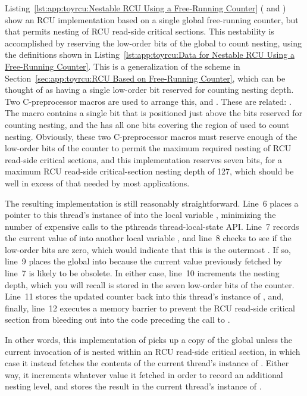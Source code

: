Listing~\ref{lst:app:toyrcu:Nestable RCU Using a Free-Running Counter}
( and )
show an RCU implementation based on a single global free-running counter,
but that permits nesting of RCU read-side critical sections.
This nestability is accomplished by reserving the low-order bits of the
global  to count nesting, using the definitions shown in
Listing~\ref{lst:app:toyrcu:Data for Nestable RCU Using a Free-Running Counter}.
This is a generalization of the scheme in
Section~\ref{sec:app:toyrcu:RCU Based on Free-Running Counter},
which can be thought of as having a single low-order bit reserved
for counting nesting depth.
Two C-preprocessor macros are used to arrange this,
 and
.
These are related: .
The  macro contains a single bit that is
positioned just above the bits reserved for counting nesting,
and the  has all one bits covering the
region of  used to count nesting.
Obviously, these two C-preprocessor macros must reserve enough
of the low-order bits of the counter to permit the maximum required
nesting of RCU read-side critical sections, and this implementation
reserves seven bits, for a maximum RCU read-side critical-section
nesting depth of 127, which should be well in excess of that needed
by most applications.

The resulting  implementation is still reasonably
straightforward.
Line~6 places a pointer to this thread's instance of 
into the local variable , minimizing the number of expensive
calls to the pthreads thread-local-state API.
Line~7 records the current value of  into another
local variable , and line~8 checks to see if the low-order
bits are zero, which would indicate that this is the outermost
.
If so, line~9 places the global  into  because
the current value previously fetched by line~7 is likely to be obsolete.
In either case, line~10 increments the nesting depth, which you will
recall is stored in the seven low-order bits of the counter.
Line~11 stores the updated counter back into this thread's instance
of , and, finally, line~12 executes a memory
barrier to prevent the RCU read-side critical section from bleeding out
into the code preceding the call to .

In other words, this implementation of  picks up a copy
of the global  unless the current invocation of
 is nested within an RCU read-side critical section,
in which case it instead fetches the contents of the current thread's
instance of .
Either way, it increments whatever value it fetched in order to record
an additional nesting level, and stores the result in the current
thread's instance of .

